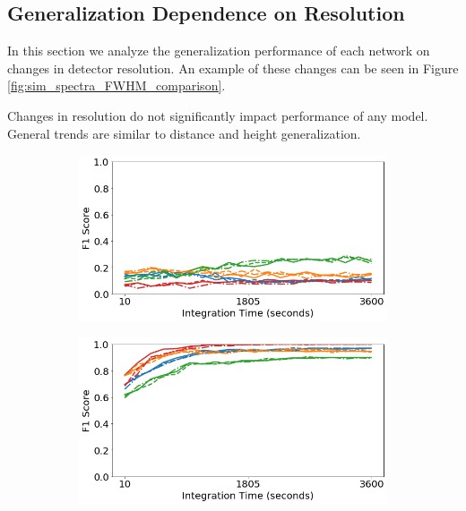 \subsection{Generalization Dependence on Resolution}

In this section we analyze the generalization performance of each network on changes in detector resolution. An example of these changes can be seen in Figure \ref{fig:sim_spectra_FWHM_comparison}.

Changes in resolution do not significantly impact performance of any model. General trends are similar to distance and height generalization.


\begin{figure}[H]
     \centering
     \begin{subfigure}[b]{0.49\textwidth}
         \centering
         \includegraphics[width=\textwidth]{images/generalization-fwhm-easy-01.png}
         \caption{}
         \label{fig:generalization-fwhm-easy-01}
     \end{subfigure}
     \hfill
     \begin{subfigure}[b]{0.49\textwidth}
         \centering
         \includegraphics[width=\textwidth]{images/generalization-fwhm-easy-05.png}
         \caption{}
         \label{fig:generalization-fwhm-easy-05}
     \end{subfigure}


\end{figure}
